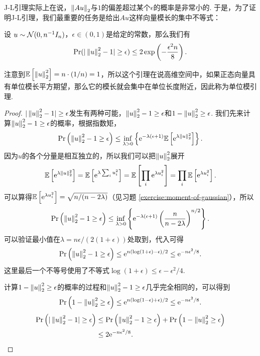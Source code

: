 J-L引理实际上在说，$\left\|Au\right\|_2$与$1$的偏差超过某个$\epsilon$的概率是非常小的. 于是，为了证明J-L引理，我们最重要的任务是给出$Au$这样向量模长的集中不等式：
\begin{lemma}[单位模引理]\label{lemma:unit-mod-lemma}
    设 $u\sim \mathcal{N}(0,n^{-1}I_n)$，$\epsilon \in (0,1 )$是给定的常数，那么我们有
    \[
        \Pr(|\left\|u\right\|_2^2 - 1| \geq \epsilon) \leq 2\exp \left(-\frac{\epsilon^2 n}{8}\right).
    \]
\end{lemma}
注意到$\mathbb{E}\left[\left\|u\right\|_2^2\right]=n\cdot(1/n)=1$，所以这个引理在说高维空间中，如果正态向量具有单位模长平方期望，那么它的模长就会集中在单位长度附近，因此称为单位模引理.

\begin{proof}
$|\left\|u\right\|_2^2 - 1| \geq \epsilon$发生有两种可能，$ \left\|u\right\|_2^2 - 1 \geq \epsilon$和$ 1 - \left\|u\right\|_2^2 \geq \epsilon$. 我们先来计算$ \left\|u\right\|_2^2 - 1 \geq \epsilon$的概率，根据指数矩，
    \[
    \Pr\left(\left\|u\right\|_2^2 - 1 \geq \epsilon\right) \leq \inf_{\lambda > 0} \left\{\mathrm{e}^{- \lambda (\epsilon + 1)} \mathbb{E} \left[\mathrm{e}^{\lambda \left\|u\right\|_2^2}\right]\right\}. 
    \]
因为$u$的各个分量是相互独立的，所以我们可以把$\left\|u\right\|_2^2$展开
    \[
    \mathbb{E}\left[\mathrm{e}^{\lambda \left\|u\right\|_2^2}\right] = \mathbb{E}\left[\mathrm{e}^{\lambda \sum_i u_i^2}\right] = \mathbb{E}\left[\prod_i \mathrm{e}^{\lambda u_i^2}\right] = \prod_i \mathbb{E}\left[\mathrm{e}^{\lambda u_i^2}\right]. 
    \]
可以算得$\mathbb{E}\left[\mathrm{e}^{\lambda u_i^2}\right]= \sqrt{n/(n-2\lambda)}$（见习题 \ref{exercise:moment-of-gaussian}），所以
    \[
    \Pr\left(\left\|u\right\|_2^2 - 1 \geq \epsilon\right) \leq \inf_{\lambda > 0} \left\{\mathrm{e}^{- \lambda (\epsilon + 1)} \left(\frac{n}{n-2\lambda} \right)^{n/2}\right\}. 
    \]
可以验证最小值在$\lambda = n\epsilon/(2(1+\epsilon))$处取到，代入可得
    \[
    \Pr\left(\left\|u\right\|_2^2 - 1 \geq \epsilon\right) \leq \mathrm{e}^{n(\log (1+\epsilon) - \epsilon)/2} \leq \mathrm{e}^{-n\epsilon^2/8}. 
    \]
这里最后一个不等号使用了不等式$\log(1+\epsilon)\leq\epsilon-\epsilon^2/4$. 

计算$1 - \left\|u\right\|_2^2 \geq \epsilon$的概率的过程和$\left\|u\right\|_2^2 - 1 \geq \epsilon$几乎完全相同的，可以得到
    \[
    \Pr\left(1 - \left\|u\right\|_2^2 \geq \epsilon\right) \leq \mathrm{e}^{n(\log (1-\epsilon) + \epsilon)/2} \leq \mathrm{e}^{-n\epsilon^2/8}. 
    \]
    \begin{align*}
        \Pr\left(| \left\|u\right\|_2^2 - 1| \geq \epsilon\right) &\leq \Pr\left(\left\|u\right\|_2^2 - 1 \geq \epsilon\right) + \Pr\left(1 - \left\|u\right\|_2^2 \geq \epsilon\right) \\
        &\leq 2\mathrm{e}^{-n\epsilon^2/8}. 
    \end{align*}
\end{proof}

